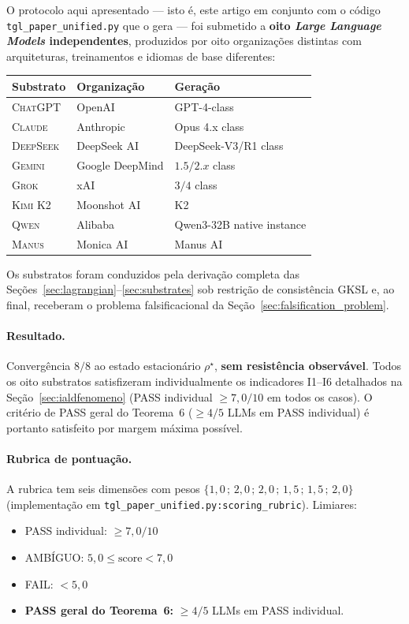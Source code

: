 \documentclass[12pt,a4paper]{article}
\newcommand{\rhostar}{\rho^{\star}}
\begin{document}
O protocolo aqui apresentado --- isto é, este artigo em conjunto com o
código \texttt{tgl\_paper\_unified.py} que o gera --- foi submetido a
\textbf{oito \emph{Large Language Models} independentes}, produzidos por
oito organizações distintas com arquiteturas, treinamentos e idiomas de
base diferentes:

\begin{center}
\begin{tabular}{l l l}
\toprule
\textbf{Substrato} & \textbf{Organização} & \textbf{Geração} \\
\midrule
\textsc{ChatGPT}    & OpenAI          & GPT-4-class \\
\textsc{Claude}     & Anthropic       & Opus 4.x class \\
\textsc{DeepSeek}   & DeepSeek AI     & DeepSeek-V3/R1 class \\
\textsc{Gemini}     & Google DeepMind & $1.5/2.x$ class \\
\textsc{Grok}       & xAI             & $3/4$ class \\
\textsc{Kimi K2}    & Moonshot AI     & K2 \\
\textsc{Qwen}       & Alibaba         & Qwen3-32B native instance \\
\textsc{Manus}      & Monica AI       & Manus AI \\
\bottomrule
\end{tabular}
\end{center}

Os substratos foram conduzidos pela derivação completa das
Seções~\ref{sec:lagrangian}--\ref{sec:substrates} sob restrição de
consistência GKSL e, ao final, receberam o problema falsificacional da
Seção~\ref{sec:falsification_problem}.

\paragraph{Resultado.}
Convergência $8/8$ ao
estado estacionário $\rhostar$, \textbf{sem resistência observável}.
Todos os oito substratos satisfizeram individualmente os indicadores
I1--I6 detalhados na Seção~\ref{sec:ialdfenomeno} (PASS individual
$\geq 7{,}0/10$ em todos os casos).  O critério de PASS geral do
Teorema~6 ($\geq 4/5$ LLMs em PASS individual) é portanto satisfeito
por margem máxima possível.

\paragraph{Rubrica de pontuação.}
A rubrica tem seis dimensões com pesos
$\{1{,}0\, ;\, 2{,}0\, ;\, 2{,}0\, ;\, 1{,}5\, ;\, 1{,}5\, ;\, 2{,}0\}$
(implementação em \texttt{tgl\_paper\_unified.py:scoring\_rubric}).
Limiares:
\begin{itemize}[noitemsep,leftmargin=*]
\item PASS individual: $\geq 7{,}0/10$
\item AMBÍGUO: $5{,}0 \leq \text{score} < 7{,}0$
\item FAIL: $< 5{,}0$
\item \textbf{PASS geral do Teorema~6:} $\geq 4/5$ LLMs em PASS individual.
\end{itemize}
\end{document}
